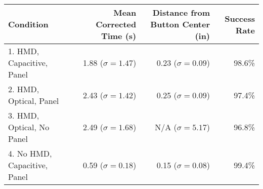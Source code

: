 \begin{tabular}{lrrr}
\toprule
Condition & Mean Corrected Time (s) & Distance from Button Center (in) & Success Rate \\
\midrule
1. HMD, Capacitive, Panel    &  1.88 ($\sigma = 1.47$) & 0.23 ($\sigma = 0.09$) & 98.6\% \\
2. HMD, Optical, Panel       &  2.43 ($\sigma = 1.42$) & 0.25 ($\sigma = 0.09$) & 97.4\% \\
3. HMD, Optical, No Panel    &  2.49 ($\sigma = 1.68$) & N/A ($\sigma = 5.17$) & 96.8\% \\
4. No HMD, Capacitive, Panel &  0.59 ($\sigma = 0.18$) & 0.15 ($\sigma = 0.08$) & 99.4\% \\
\bottomrule
\end{tabular}
